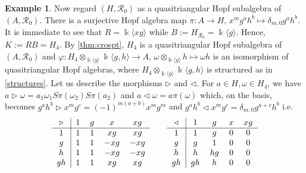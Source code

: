 \documentclass[nosumlimits,twoside]{amsart}
\theoremstyle{definition}
\newtheorem{example}[example]{\sc Example}
\theoremstyle{remark}
\newcommand{\rd}[1]{{\color{red}{#1}}}
\newcommand{\Rr}{\mathcal{R}}
\newcommand{\ot}{\otimes}
\begin{document}
\begin{example}
Now regard $(H,\Rr_{0})$ as a quasitriangular Hopf subalgebra of $(A,\Rr_{0})$. There is a surjective Hopf algebra map $\pi:A\to H$, $x^{m}g^{a}h^{b}\mapsto\delta_{m,0}g^{a}h^{b}$. %
It is immediate to see that $R=\Bbbk\langle xg\rangle$ while $B:=H_{\Rr_{0}}=\Bbbk \langle g\rangle$. Hence, $K:=RB=H_{4}$. By
\cref{thm:crospt}, $H_{4}$ is a quasitriangular Hopf subalgebra of $(A,\Rr_{0})$ and $\varphi:H_{4}\ot_{\Bbbk\langle g\rangle}\Bbbk\langle g,h\rangle\to A$, $\omega\ot_{\Bbbk\langle g\rangle}h\mapsto \omega h$ is an isomorphism of quasitriangular Hopf algebras, where $H_{4}\ot_{\Bbbk\langle g\rangle}\Bbbk\langle g,h\rangle$ is structured as in \cref{structures}. Let us describe the morphisms $\triangleright$ and $\triangleleft$. For $a\in H,\omega\in H_{4}$, we have $a\triangleright\omega=a_{1}\omega_{1}S\pi(\omega_{2})S\pi(a_{2})$ and $a\triangleleft\omega=a\pi(\omega)$ which, on the basis, becomes  $g^ah^b\triangleright x^mg^c=(-1)^{m(a+b)}x^mg^m$ and $g^ah^b\triangleleft x^mg^c=\delta_{m,0}g^{a+c}h^b$ i.e. \[
\begin{tabular}{c|cccc}
    $\triangleright$& $1$ & $g$ & $x$ & $xg$\\ \hline
    $1$ & $1$ & $1$ & $xg$ & $xg$ \\ 
    $g$ & $1$ & $1$ & $-xg$ & $-xg$ \\ 
    $h$ & $1$ & $1$ & $-xg$ & $-xg$ \\ 
    $gh$ & $1$ & $1$ & $xg$ & $xg$ \\ 
    \end{tabular} 
    \qquad
    \begin{tabular}{c|cccc}
    $\triangleleft$& $1$ & $g$ & $x$ & $xg$\\ \hline
    $1$ & $1$ & $g$ & $0$ & $0$ \\ 
    $g$ & $g$ & $1$ & $0$ & $0$ \\ 
    $h$ & $h$ & $hg$ & $0$ & $0$ \\ 
    $gh$ & $gh$ & $h$ & $0$ & $0$ \\ 
    \end{tabular}
\]
\end{example}


\end{document}

